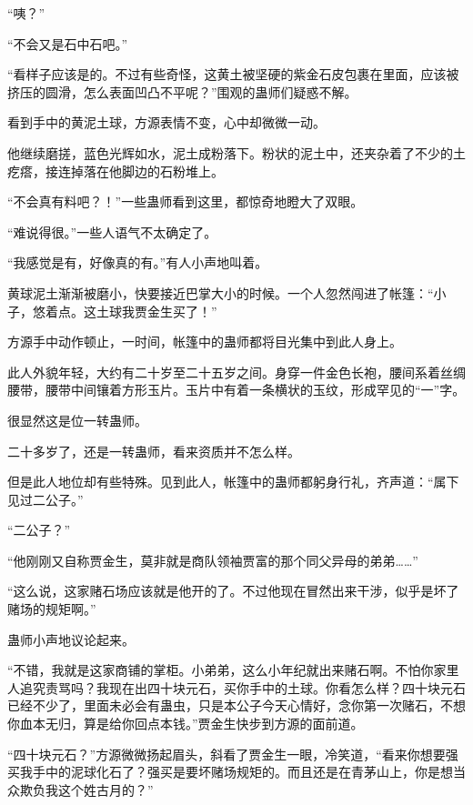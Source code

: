 
\begin{this_body}

“咦？”

“不会又是石中石吧。”

“看样子应该是的。不过有些奇怪，这黄土被坚硬的紫金石皮包裹在里面，应该被挤压的圆滑，怎么表面凹凸不平呢？”围观的蛊师们疑惑不解。

看到手中的黄泥土球，方源表情不变，心中却微微一动。

他继续磨搓，蓝色光辉如水，泥土成粉落下。粉状的泥土中，还夹杂着了不少的土疙瘩，接连掉落在他脚边的石粉堆上。

“不会真有料吧？！”一些蛊师看到这里，都惊奇地瞪大了双眼。

“难说得很。”一些人语气不太确定了。

“我感觉是有，好像真的有。”有人小声地叫着。

黄球泥土渐渐被磨小，快要接近巴掌大小的时候。一个人忽然闯进了帐篷：“小子，悠着点。这土球我贾金生买了！”

方源手中动作顿止，一时间，帐篷中的蛊师都将目光集中到此人身上。

此人外貌年轻，大约有二十岁至二十五岁之间。身穿一件金色长袍，腰间系着丝绸腰带，腰带中间镶着方形玉片。玉片中有着一条横状的玉纹，形成罕见的“一”字。

很显然这是位一转蛊师。

二十多岁了，还是一转蛊师，看来资质并不怎么样。

但是此人地位却有些特殊。见到此人，帐篷中的蛊师都躬身行礼，齐声道：“属下见过二公子。”

“二公子？”

“他刚刚又自称贾金生，莫非就是商队领袖贾富的那个同父异母的弟弟……”

“这么说，这家赌石场应该就是他开的了。不过他现在冒然出来干涉，似乎是坏了赌场的规矩啊。”

蛊师小声地议论起来。

“不错，我就是这家商铺的掌柜。小弟弟，这么小年纪就出来赌石啊。不怕你家里人追究责骂吗？我现在出四十块元石，买你手中的土球。你看怎么样？四十块元石已经不少了，里面未必会有蛊虫，只是本公子今天心情好，念你第一次赌石，不想你血本无归，算是给你回点本钱。”贾金生快步到方源的面前道。

“四十块元石？”方源微微扬起眉头，斜看了贾金生一眼，冷笑道，“看来你想要强买我手中的泥球化石了？强买是要坏赌场规矩的。而且还是在青茅山上，你是想当众欺负我这个姓古月的？”


\end{this_body}
